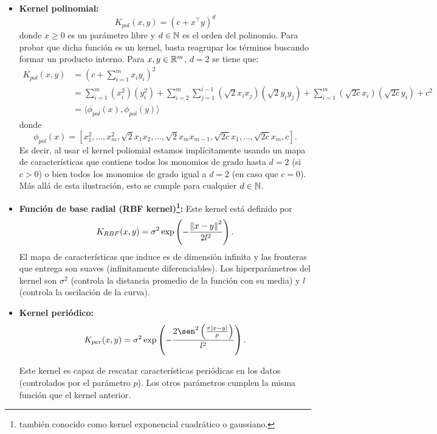 \begin{itemize}
    \item   \textbf{Kernel polinomial:}
    \begin{equation}
       K_{pol} (x, y) = (c + x^\top y)^d
    \end{equation}
    donde $x\geq 0$ es un parámetro libre y $d\in{\mathbb N}$ es el orden del polinomio. Para probar que dicha función es un kernel, basta reagrupar los términos buscando formar un producto interno. Para $x,y\in\mathbb{R}^m$, $d=2$ se tiene que: 
    \begin{align}
        K_{pol} (x, y)  &= \left(c + \sum_{i=1}^m x_iy_i\right)^2\\
                        &= \sum_{i=1}^m (x_i^2)(y_i^2) + \sum_{i=2}^m \sum_{j=1}^{i-1} (\sqrt{2}x_ix_j)(\sqrt{2}y_iy_j) + \sum_{i=1}^m (\sqrt{2c}x_i)(\sqrt{2c}y_i) + c^2\\
                        &=\langle \phi_{pol}(x) , \phi_{pol}(y) \rangle
    \end{align}
    donde 
    \begin{equation}
        \phi_{pol}(x) = [x_1^2,\ldots,x_m^2,\sqrt{2}x_1x_2,\ldots, \sqrt{2}x_{m}x_{m-1},\sqrt{2c}x_1,\ldots,\sqrt{2c}x_m,c].
    \end{equation}
    Es decir, al usar el kernel poliomial estamos implícitamente usando un mapa de características que contiene todos los monomios de grado hasta $d=2$ (si $c>0$) o bien todos los monomios de grado igual a $d=2$ (en caso que $c=0$). Más allá de esta ilustración, esto se cumple para cualquier $d\in{\mathbb N}$.
    \item \textbf{Función de base radial (RBF kernel)\footnote{también conocido como kernel exponencial cuadrático o gaussiano.}:} Este kernel está definido por
    \begin{equation}
        K_{RBF} (x , y ) = \sigma^2 \exp\left(-\frac{\left\lVert x -y\right\rVert^2}{2l^2}\right).
    \end{equation}
    El mapa de características que induce es de dimensión infinita y las fronteras que entrega son suaves (infinitamente diferenciables). Los hiperparámetros del kernel son $\sigma^2$ (controla la distancia promedio de la función con su media) y $l$ (controla la oscilación de la curva).
        
    \item \textbf{Kernel periódico:}
    \begin{equation}
       K_{per} (x , y) = \sigma^2 \exp\left(- \frac{2\sen^2 \left(\frac{\pi|x -y|}{p}\right)}{l^2}\right).
    \end{equation}
    
    Este kernel es capaz de rescatar características periódicas en los datos (controlados por el parámetro $p$). Los otros parámetros cumplen la misma función que el kernel anterior. 
    
\end{itemize}

